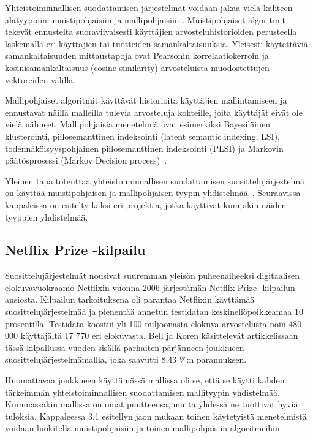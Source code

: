 \documentclass[12pt,finnish]{tktltiki2}
\theoremstyle{definition}
\theoremstyle{remark}
\begin{document}
         Yhteistoiminnallisen suodattamisen järjestelmät voidaan jakaa vielä kahteen alatyyppiin: muistipohjaisiin ja mallipohjaisiin \cite{Das:2007:GNP:1242572.1242610}. Muistipohjaiset algoritmit tekevät ennusteita suoraviivaisesti käyttäjien arvosteluhistorioiden perusteella laskemalla eri käyttäjien tai tuotteiden samankaltaisuuksia. Yleisesti käytettäviä samankaltaisuuden mittaustapoja ovat Pearsonin korrelaatiokerroin ja kosinisamankaltaisuus (cosine similarity) arvosteluista muodostettujen vektoreiden välillä.
         
Mallipohjaiset algoritmit käyttävät historioita käyttäjien mallintamiseen ja ennustavat näillä malleilla tulevia arvosteluja kohteille, joita käyttäjät eivät ole vielä nähneet. Mallipohjaisia menetelmiä ovat esimerkiksi Bayesiläinen klusterointi, piilosemanttinen indeksointi (latent semantic indexing, LSI), todennäköisyyspohjainen piilosemanttinen indeksointi (PLSI) ja Markovin päätösprosessi (Markov Decision process)~\cite{Das:2007:GNP:1242572.1242610}.
        
Yleinen tapa toteuttaa yhteistoiminnallisen suodattamisen suosittelujärjestelmä on käyttää muistipohjaisen ja mallipohjaisen tyypin yhdistelmää~\cite{Burke:2002:HRS:586321.586352}. Seuraavissa kappaleissa on esitelty kaksi eri projektia, jotka käyttivät kumpikin näiden tyyppien yhdistelmää.

\subsection{Netflix Prize -kilpailu}

        Suosittelujärjestelmät nousivat suuremman yleisön puheenaiheeksi digitaalisen elokuvavuokraamo Netflixin vuonna 2006 järjestämän Netflix Prize -kilpailun ansiosta. Kilpailun tarkoituksena oli parantaa Netflixin käyttämää suosittelujärjestelmää ja pienentää annetun testidatan keskineliöpoikkeamaa 10 prosentilla. Testidata koostui yli 100 miljoonasta elokuva-arvostelusta noin 480 000 käyttäjältä 17 770 eri elokuvasta. Bell ja Koren käsittelevät artikkelissaan~\cite{Bell:2007:LNP:1345448.1345465} tässä kilpailussa vuoden sisällä parhaiten pärjänneen joukkueen suosittelujärjestelmämallia, joka saavutti 8,43 \%:n parannuksen.
        
        Huomattavaa joukkueen käyttämässä mallissa oli se, että se käytti kahden tärkeimmän yhteistoiminnallisen suodattamisen mallityypin yhdistelmää. Kummassakin mallissa on omat puutteensa, mutta yhdessä ne tuottivat hyviä tuloksia. Kappaleessa 3.1 esitellyn jaon mukaan toinen käytetyistä menetelmistä voidaan luokitella muistipohjaisiin ja toinen mallipohjaisiin algoritmeihin.
        
\end{document}
